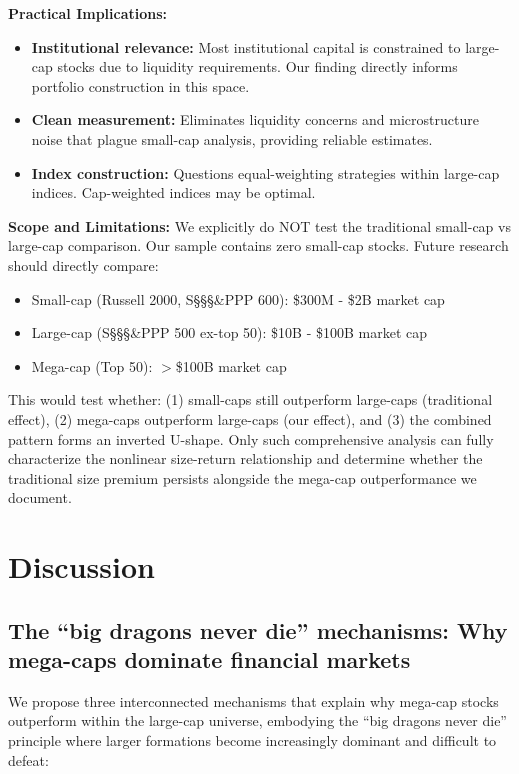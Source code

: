 \documentclass[10pt,letterpaper]{article}
\begin{document}
\textbf{Practical Implications:}
\begin{itemize}
\item \textbf{Institutional relevance:} Most institutional capital is constrained to large-cap stocks due to liquidity requirements. Our finding directly informs portfolio construction in this space.
\item \textbf{Clean measurement:} Eliminates liquidity concerns and microstructure noise that plague small-cap analysis, providing reliable estimates.
\item \textbf{Index construction:} Questions equal-weighting strategies within large-cap indices. Cap-weighted indices may be optimal.
\end{itemize}

\textbf{Scope and Limitations:} We explicitly do NOT test the traditional small-cap vs large-cap comparison. Our sample contains zero small-cap stocks. Future research should directly compare:
\begin{itemize}
\item Small-cap (Russell 2000, S\S\S\S\&PPP 600): \$300M - \$2B market cap
\item Large-cap (S\S\S\S\&PPP 500 ex-top 50): \$10B - \$100B market cap  
\item Mega-cap (Top 50): $>$\$100B market cap
\end{itemize}
This would test whether: (1) small-caps still outperform large-caps (traditional effect), (2) mega-caps outperform large-caps (our effect), and (3) the combined pattern forms an inverted U-shape. Only such comprehensive analysis can fully characterize the nonlinear size-return relationship and determine whether the traditional size premium persists alongside the mega-cap outperformance we document.

\section*{Discussion}

\subsection*{The ``big dragons never die'' mechanisms: Why mega-caps dominate financial markets}

We propose three interconnected mechanisms that explain why mega-cap stocks outperform within the large-cap universe, embodying the ``big dragons never die'' principle where larger formations become increasingly dominant and difficult to defeat:
\end{document}
